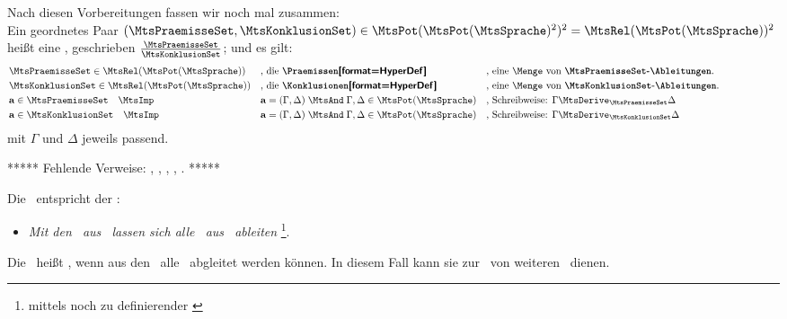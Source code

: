 Nach diesen Vorbereitungen fassen wir noch mal zusammen:\\
Ein geordnetes Paar $(\MtsPraemisseSet, \MtsKonklusionSet) \in \MtsPotAllDerive^2 = \MtsRelAllDerive^2$ heißt eine
  \MtsSprache, geschrieben $\frac{\MtsPraemisseSet}{\MtsKonklusionSet}$; und es gilt:
\begin{align}
	& \MtsPraemisseSet \in \MtsRelAllDerive
	&& \text{, die \defTxt{\Praemissen}}
	&& \text{, eine \Menge\ von \DefFt{\MtsPraemisseSet-\Ableitungen}.}
	\label{def:ruleRelationPraemissen}
	\\
	& \MtsKonklusionSet   \in \MtsRelAllDerive
	&& \text{, die \defTxt{\Konklusionen}}
	&& \text{, eine \Menge\ von   \DefFt{\MtsKonklusionSet-\Ableitungen}.}
	\label{def:ruleRelationKonklusionen}
	\\
	& \drvft{a} \in \MtsPraemisseSet \quad \MtsImp
	&& \drvft{a} = (\Gamma, \Delta) \; \MtsAnd \; \Gamma, \Delta \in \MtsPotSprache
	&& \text{, Schreibweise: } \Gamma \MtsDerive_{\MtsPraemisseSet} \Delta
	\\
	& \drvft{a} \in \MtsKonklusionSet \quad \MtsImp
	&& \drvft{a} = (\Gamma, \Delta) \; \MtsAnd \; \Gamma, \Delta \in \MtsPotSprache
	&& \text{, Schreibweise: } \Gamma \MtsDerive_{\MtsKonklusionSet} \Delta
	\formulatoleft
\end{align}
mit $\Gamma$ und $\Delta$ jeweils passend.

***** Fehlende Verweise: \Ableitungsmenge, \OjkEqN, \MtsTrue, \MtsDerive, \MtsDeriveR. *****

Die \Schlussregel\ entspricht der \Aussage:
\begin{itemize}
	\item[] \emph{Mit den \Praemissen\ aus \MtsPraemisseSet\ lassen sich alle \Konklusionen\ aus \MtsKonklusionSet\ ableiten}%
	\footnote{mittels noch zu definierender \emph{\zulaessigerTransformationen}}.
\end{itemize}
Die \Schlussregel\ heißt , wenn aus den \Praemissen\ alle \Konklusionen\ abgleitet werden können.
In diesem Fall kann sie zur \zulaessigenTransformation\ von weiteren \Formeln\ dienen.

